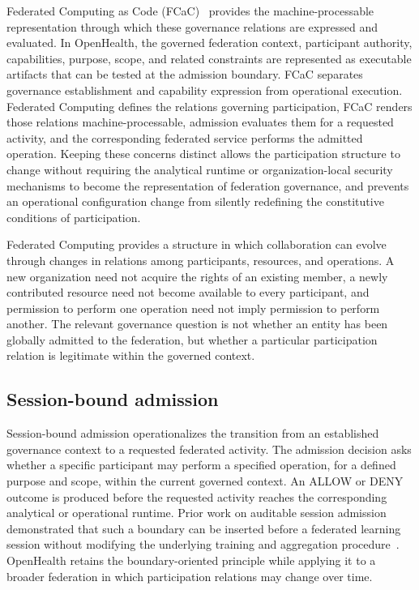 \documentclass[twoside,11pt]{article}
\begin{document}
Federated Computing as Code (FCaC)~\cite{Fenoglio_FCaC_2026}  provides the machine-processable representation through which these governance relations are expressed and evaluated. In OpenHealth, the governed federation context, participant authority, capabilities, purpose, scope, and related constraints are represented as executable artifacts that can be tested at the admission boundary. FCaC   separates governance establishment and capability expression from operational execution. Federated Computing defines the relations governing participation, FCaC renders those relations machine-processable, admission evaluates them for a requested activity, and the corresponding federated service performs the admitted operation. Keeping these concerns distinct allows the participation structure to change without requiring the analytical runtime or organization-local security mechanisms to become the representation of federation governance, and prevents an operational configuration change from silently redefining the constitutive conditions of participation.

Federated Computing  provides a structure in which collaboration can evolve through changes in relations among participants, resources, and operations. A new organization need not acquire the rights of an existing member, a newly contributed resource need not become available to every participant, and permission to perform one operation need not imply permission to perform another. The relevant governance question is   not whether an entity has been globally admitted to the federation, but whether a particular participation relation is legitimate within the governed context.

\subsection{Session-bound admission}

Session-bound admission operationalizes the transition from an established governance context to a requested federated activity. The admission decision asks whether a specific participant may perform a specified operation, for a defined purpose and scope, within the current governed context. An ALLOW or DENY outcome is produced before the requested activity reaches the corresponding analytical or operational runtime. Prior work on auditable session admission demonstrated that such a boundary can be inserted before a federated learning session without modifying the underlying training and aggregation procedure~\cite{Fenoglio_FLICS_2026}. OpenHealth retains the boundary-oriented principle while applying it to a broader federation in which participation relations may change over time.
\end{document}
